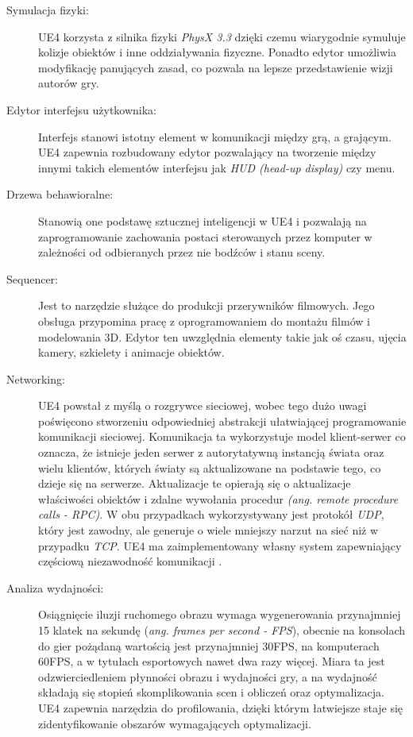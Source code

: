\documentclass[multip]{SGGW-thesis}
\begin{document}
\begin{description}
\item[Symulacja fizyki:]UE4 korzysta z silnika fizyki {\em PhysX 3.3} dzięki czemu wiarygodnie symuluje kolizje obiektów i inne oddziaływania fizyczne. Ponadto edytor umożliwia modyfikację panujących zasad, co pozwala na lepsze przedstawienie wizji autorów gry.
\item[Edytor interfejsu użytkownika:] Interfejs stanowi istotny element w komunikacji między grą, a grającym. UE4 zapewnia rozbudowany edytor pozwalający na tworzenie między innymi takich elementów interfejsu jak {\em HUD (head-up display)} czy menu.
\item[Drzewa behawioralne:]Stanowią one podstawę sztucznej inteligencji w UE4 i pozwalają na zaprogramowanie zachowania postaci sterowanych przez komputer w zależności od odbieranych przez nie bodźców i stanu sceny.
\item[Sequencer:]Jest to narzędzie służące do produkcji przerywników filmowych. Jego obsługa przypomina pracę z oprogramowaniem do montażu filmów i modelowania 3D. Edytor ten uwzględnia elementy takie jak oś czasu, ujęcia kamery, szkielety i animacje obiektów.
\item[Networking:]UE4 powstał z myślą o rozgrywce sieciowej, wobec tego dużo uwagi poświęcono stworzeniu odpowiedniej abstrakcji ułatwiającej programowanie komunikacji sieciowej. Komunikacja ta wykorzystuje model klient-serwer co oznacza, że istnieje jeden serwer z autorytatywną instancją świata oraz wielu klientów, których światy są aktualizowane na podstawie tego, co dzieje się na serwerze. Aktualizacje te opierają się o aktualizacje właściwości obiektów i zdalne wywołania procedur {\em (ang. remote procedure calls - RPC)}. W obu przypadkach wykorzystywany jest protokół {\em UDP}, który jest zawodny, ale generuje o wiele mniejszy narzut na sieć niż w przypadku {\em TCP}. UE4 ma zaimplementowany własny system zapewniający częściową niezawodność komunikacji \cite{unreal-wiki-replication}.
\item[Analiza wydajności:]Osiągnięcie iluzji ruchomego obrazu wymaga wygenerowania przynajmniej 15 klatek na sekundę ({\em ang. frames per second - FPS}), obecnie na konsolach do gier pożądaną wartością jest przynajmniej 30FPS, na komputerach 60FPS\cite{docs-profiler}, a w tytułach esportowych nawet dwa razy więcej. Miara ta jest odzwierciedleniem płynności obrazu i wydajności gry, a na wydajność składają się stopień skomplikowania scen i obliczeń oraz optymalizacja. UE4 zapewnia narzędzia do profilowania, dzięki którym łatwiejsze staje się zidentyfikowanie obszarów wymagających optymalizacji.

\end{description}
\end{document}
